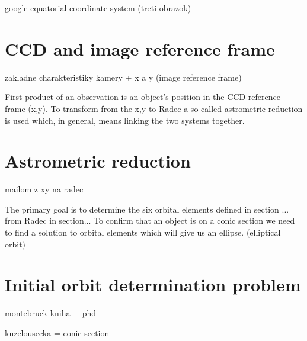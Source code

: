 google	equatorial coordinate system (treti obrazok)

\section{CCD and image reference frame}\label{sec:ccd}
zakladne charakteristiky kamery + x a y (image reference frame)

	First product of an observation is an object's position in the CCD reference frame (x,y). To transform from the x,y to Radec a so called astrometric reduction is used which, in general, means linking the two systems together.

\section{Astrometric reduction}\label{sec:proc_seg_reduc}
mailom z xy na radec

	The primary goal is to determine the six orbital elements defined in section ... from Radec in section... To confirm that an object is on a conic section we need to find a solution to orbital elements which will give us an ellipse. (elliptical orbit)

\section{Initial orbit determination problem}\label{sec:init_orbit_det}
montebruck kniha + phd

kuzelousecka = conic section